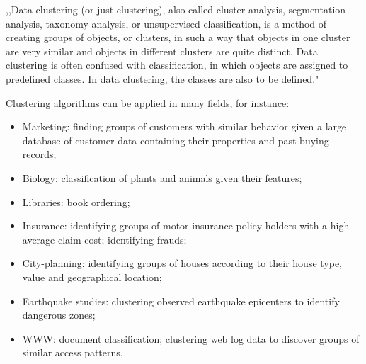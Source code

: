 ,,Data clustering (or just clustering), also called cluster analysis, segmentation analysis, taxonomy analysis, or unsupervised classification, is a method of creating groups of objects, or clusters, in such a way that objects in one cluster are very similar and objects in different clusters are quite distinct. Data clustering is often confused with classification, in which objects are assigned to predefined classes. In data clustering, the classes are also to be defined."~\cite{data_clustering_book}


Clustering algorithms can be applied in many fields, for instance:

\begin{itemize}
\item Marketing: finding groups of customers with similar behavior given a large database of customer data containing their properties and past buying records;
\item Biology: classification of plants and animals given their features;
\item Libraries: book ordering;
\item Insurance: identifying groups of motor insurance policy holders with a high average claim cost; identifying frauds;
\item City-planning: identifying groups of houses according to their house type, value and geographical location;
\item Earthquake studies: clustering observed earthquake epicenters to identify dangerous zones;
\item WWW: document classification; clustering web log data to discover groups of similar access patterns.
\end{itemize}